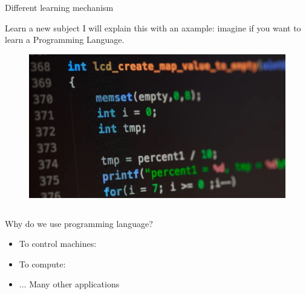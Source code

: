 \documentclass[12pt]{beamer}
\begin{document}
\begin{frame}{Different learning mechanism}
\begin{block}{Learn a new subject}
I will explain this with an axample: imagine if you want to learn a Programming Language.
\end{block}

 {
        \begin{figure}
        \includegraphics[scale=0.3]{Figures/CC.jpg}
        \end{figure}}

 \begin{columns}
\begin{block}{Why do we use programming language?}
\begin{itemize}
\item<2-> To control machines:
\item<3-> To compute:
\item<4-> ... Many other applications
\end{itemize}
\end{block} 


\end{columns}
\end{frame}
\end{document}
